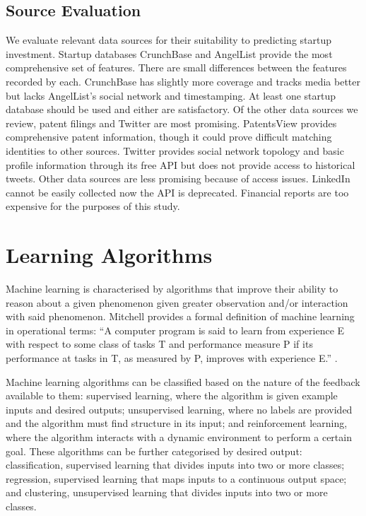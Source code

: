 \documentclass[../thesis/thesis.tex]{subfiles}
\begin{document}
\begin{refsection}
\begin{description}
\end{description}

\subsection{Source Evaluation}

We evaluate relevant data sources for their suitability to predicting startup investment. Startup databases CrunchBase and AngelList provide the most comprehensive set of features. There are small differences between the features recorded by each. CrunchBase has slightly more coverage and tracks media better but lacks AngelList's social network and timestamping. At least one startup database should be used and either are satisfactory. Of the other data sources we review, patent filings and Twitter are most promising. PatentsView provides comprehensive patent information, though it could prove difficult matching identities to other sources. Twitter provides social network topology and basic profile information through its free API but does not provide access to historical tweets. Other data sources are less promising because of access issues. LinkedIn cannot be easily collected now the API is deprecated. Financial reports are too expensive for the purposes of this study.

\section{Learning Algorithms}
\label{sec:litreview:algorithms}

Machine learning is characterised by algorithms that improve their ability to reason about a given phenomenon given greater observation and/or interaction with said phenomenon. Mitchell provides a formal definition of machine learning in operational terms: ``A computer program is said to learn from experience E with respect to some class of tasks T and performance measure P if its performance at tasks in T, as measured by P, improves with experience E.'' \cite{mitchell1997}.

Machine learning algorithms can be classified based on the nature of the feedback available to them: supervised learning, where the algorithm is given example inputs and desired outputs; unsupervised learning, where no labels are provided and the algorithm must find structure in its input; and reinforcement learning, where the algorithm interacts with a dynamic environment to perform a certain goal. These algorithms can be further categorised by desired output: classification, supervised learning that divides inputs into two or more classes; regression, supervised learning that maps inputs to a continuous output space; and clustering, unsupervised learning that divides inputs into two or more classes.


\end{refsection}
\end{document}

